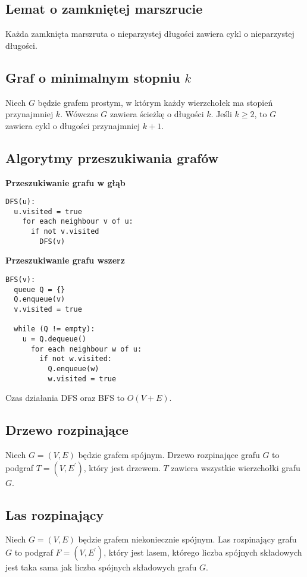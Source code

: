 \subsection*{Lemat o zamkniętej marszrucie}
Każda zamknięta marszruta o nieparzystej długości zawiera cykl o nieparzystej
długości.

\subsection*{Graf o minimalnym stopniu $k$}
Niech $G$ będzie grafem prostym, w którym każdy wierzchołek ma stopień 
przynajmniej $k$. Wówczas $G$ zawiera ścieżkę o długości $k$. Jeśli $k \geq 2$,
to $G$ zawiera cykl o długości przynajmniej $k+1$.

\subsection*{Algorytmy przeszukiwania grafów}
\textbf{Przeszukiwanie grafu w głąb}
\begin{lstlisting}[style=code]
DFS(u):
  u.visited = true
    for each neighbour v of u:
      if not v.visited
        DFS(v)
\end{lstlisting}

\textbf{Przeszukiwanie grafu wszerz}
\begin{lstlisting}[style=code]
BFS(v):
  queue Q = {}
  Q.enqueue(v)
  v.visited = true
    
  while (Q != empty):
    u = Q.dequeue()
      for each neighbour w of u:
        if not w.visited:
          Q.enqueue(w)
          w.visited = true
\end{lstlisting}
Czas działania DFS oraz BFS to $O(V + E)$.

\subsection*{Drzewo rozpinające}
Niech $G = (V, E)$ będzie grafem spójnym. Drzewo rozpinające grafu $G$ to 
podgraf $T = (V, E^\prime)$, który jest drzewem. $T$ zawiera wszystkie
wierzchołki grafu $G$.

\subsection*{Las rozpinający}
Niech $G = (V, E)$ będzie grafem niekoniecznie spójnym. Las rozpinający
grafu $G$ to podgraf $F = (V, E^\prime)$, który jest lasem, którego liczba
spójnych składowych jest taka sama jak liczba spójnych składowych grafu $G$.

